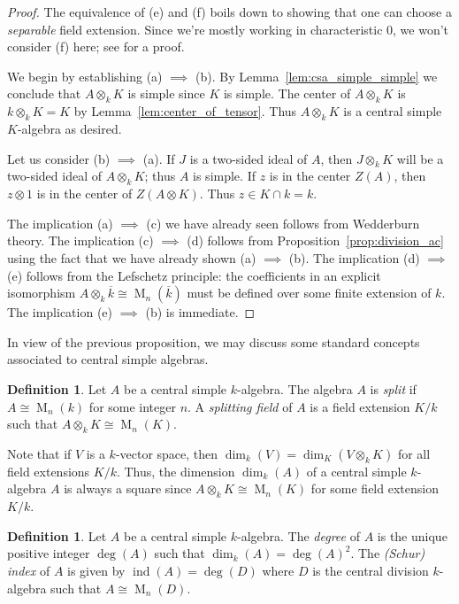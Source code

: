 \documentclass[12pt]{article}
\theoremstyle{plain}
\theoremstyle{definition}
\newtheorem{definition}[theorem]{Definition}
\theoremstyle{remark}
\numberwithin{equation}{section}
\begin{document}
\begin{proof}
The equivalence of (e) and (f) boils down to showing that one can choose
a \emph{separable} field extension.
Since we're mostly working in
characteristic $0$, we won't consider (f) here;
see \cite[Proposition 2.2.5]{GS} for a proof.

We begin by establishing (a) $\implies$ (b).
By Lemma~\ref{lem:csa_simple_simple} we conclude that $A \otimes_k K$
is simple since $K$ is simple.  The center of $A \otimes_k K$
is $k \otimes_k K=K$ by Lemma~\ref{lem:center_of_tensor}.
Thus $A \otimes_k K$ is a central simple $K$-algebra as desired.

Let us consider (b) $\implies$ (a).
If $J$ is a two-sided ideal of $A$, then $J \otimes_k K$ will be a
two-sided ideal of $A \otimes_k K$; thus $A$ is simple.
If $z$ is in the center $Z(A)$, then $z \otimes 1$ is in the
center of $Z(A \otimes K)$.  Thus $z \in K \cap k = k$.

The implication (a) $\implies$ (c) we have already seen follows from
Wedderburn theory.
The implication (c) $\implies$ (d) follows from
Proposition~\ref{prop:division_ac}
using the fact that we have already shown (a) $\implies$ (b).
The implication (d) $\implies$ (e) follows from the Lefschetz principle:
the coefficients in an explicit isomorphism
$A \otimes_k \overline{k} \cong \operatorname{M}_n(\overline{k})$
must be defined over some finite extension of $k$.
The implication (e) $\implies$ (b) is immediate.
\end{proof}

In view of the previous proposition, we may discuss some standard
concepts associated to central simple algebras.

\begin{definition}
Let $A$ be a central simple $k$-algebra.
The algebra $A$ is \emph{split} if $A \cong \operatorname{M}_n(k)$
for some integer $n$.  A \emph{splitting field} of $A$ is a field
extension $K/k$ such that $A \otimes_k K \cong \operatorname{M}_n(K)$.
\end{definition}

Note that if $V$ is a $k$-vector space,
then $\dim_k(V) = \dim_K(V \otimes_k K)$
for all field extensions $K/k$.
Thus, the dimension $\dim_k(A)$ of a central simple $k$-algebra $A$
is always a square since
$A \otimes_k K \cong \operatorname{M}_n(K)$ for some field extension
$K/k$.

\begin{definition}
Let $A$ be a central simple $k$-algebra.
The \emph{degree} of $A$ is the unique positive integer
$\deg(A)$ such that
$\dim_k(A)=\deg(A)^2$.
The \emph{(Schur) index} of $A$ is given by $\operatorname{ind}(A)=\deg(D)$
where $D$ is the central division $k$-algebra such that
$A\cong \operatorname{M}_n(D)$.
\end{definition}
\end{document}
